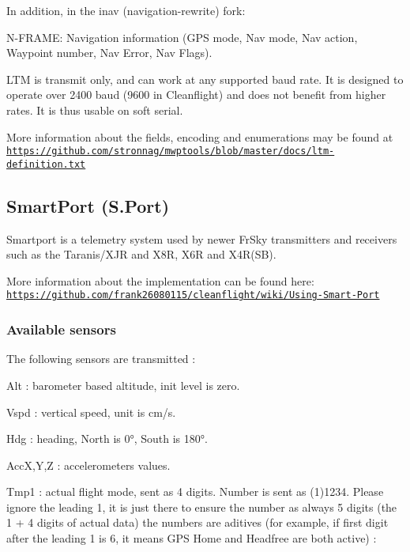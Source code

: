 In addition, in the inav (navigation-\/rewrite) fork\+:
\begin{DoxyItemize}
\item N-\/\+F\+R\+A\+M\+E\+: Navigation information (G\+P\+S mode, Nav mode, Nav action, Waypoint number, Nav Error, Nav Flags).
\end{DoxyItemize}

L\+T\+M is transmit only, and can work at any supported baud rate. It is designed to operate over 2400 baud (9600 in Cleanflight) and does not benefit from higher rates. It is thus usable on soft serial.

More information about the fields, encoding and enumerations may be found at \href{https://github.com/stronnag/mwptools/blob/master/docs/ltm-definition.txt}{\tt https\+://github.\+com/stronnag/mwptools/blob/master/docs/ltm-\/definition.\+txt}

\subsection*{Smart\+Port (S.\+Port)}

Smartport is a telemetry system used by newer Fr\+Sky transmitters and receivers such as the Taranis/\+X\+J\+R and X8\+R, X6\+R and X4\+R(\+S\+B).

More information about the implementation can be found here\+: \href{https://github.com/frank26080115/cleanflight/wiki/Using-Smart-Port}{\tt https\+://github.\+com/frank26080115/cleanflight/wiki/\+Using-\/\+Smart-\/\+Port}

\subsubsection*{Available sensors}

The following sensors are transmitted \+:

Alt \+: barometer based altitude, init level is zero.

Vspd \+: vertical speed, unit is cm/s.

Hdg \+: heading, North is 0°, South is 180°.

Acc\+X,Y,Z \+: accelerometers values.

Tmp1 \+: actual flight mode, sent as 4 digits. Number is sent as (1)1234. Please ignore the leading 1, it is just there to ensure the number as always 5 digits (the 1 + 4 digits of actual data) the numbers are aditives (for example, if first digit after the leading 1 is 6, it means G\+P\+S Home and Headfree are both active) \+:


